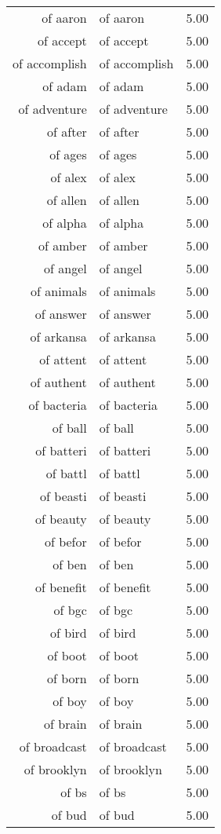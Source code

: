 \begin{table}[ht]
\begin{tabular}{rlr}
  of aaron & of aaron & 5.00 \\ 
  of accept & of accept & 5.00 \\ 
  of accomplish & of accomplish & 5.00 \\ 
  of adam & of adam & 5.00 \\ 
  of adventure & of adventure & 5.00 \\ 
  of after & of after & 5.00 \\ 
  of ages & of ages & 5.00 \\ 
  of alex & of alex & 5.00 \\ 
  of allen & of allen & 5.00 \\ 
  of alpha & of alpha & 5.00 \\ 
  of amber & of amber & 5.00 \\ 
  of angel & of angel & 5.00 \\ 
  of animals & of animals & 5.00 \\ 
  of answer & of answer & 5.00 \\ 
  of arkansa & of arkansa & 5.00 \\ 
  of attent & of attent & 5.00 \\ 
  of authent & of authent & 5.00 \\ 
  of bacteria & of bacteria & 5.00 \\ 
  of ball & of ball & 5.00 \\ 
  of batteri & of batteri & 5.00 \\ 
  of battl & of battl & 5.00 \\ 
  of beasti & of beasti & 5.00 \\ 
  of beauty & of beauty & 5.00 \\ 
  of befor & of befor & 5.00 \\ 
  of ben & of ben & 5.00 \\ 
  of benefit & of benefit & 5.00 \\ 
  of bgc & of bgc & 5.00 \\ 
  of bird & of bird & 5.00 \\ 
  of boot & of boot & 5.00 \\ 
  of born & of born & 5.00 \\ 
  of boy & of boy & 5.00 \\ 
  of brain & of brain & 5.00 \\ 
  of broadcast & of broadcast & 5.00 \\ 
  of brooklyn & of brooklyn & 5.00 \\ 
  of bs & of bs & 5.00 \\ 
  of bud & of bud & 5.00 \\ 

\end{tabular}
\end{table}
